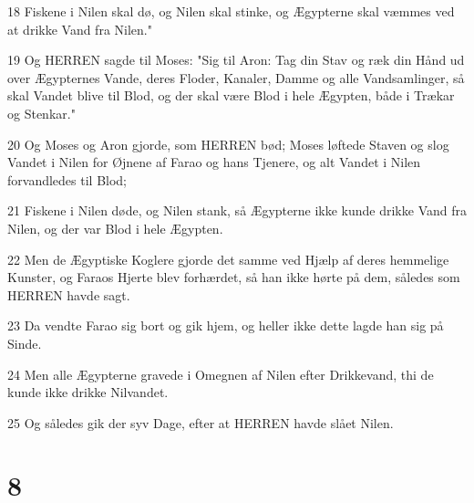 \par 18 Fiskene i Nilen skal dø, og Nilen skal stinke, og Ægypterne skal væmmes ved at drikke Vand fra Nilen."
\par 19 Og HERREN sagde til Moses: "Sig til Aron: Tag din Stav og ræk din Hånd ud over Ægypternes Vande, deres Floder, Kanaler, Damme og alle Vandsamlinger, så skal Vandet blive til Blod, og der skal være Blod i hele Ægypten, både i Trækar og Stenkar."
\par 20 Og Moses og Aron gjorde, som HERREN bød; Moses løftede Staven og slog Vandet i Nilen for Øjnene af Farao og hans Tjenere, og alt Vandet i Nilen forvandledes til Blod;
\par 21 Fiskene i Nilen døde, og Nilen stank, så Ægypterne ikke kunde drikke Vand fra Nilen, og der var Blod i hele Ægypten.
\par 22 Men de Ægyptiske Koglere gjorde det samme ved Hjælp af deres hemmelige Kunster, og Faraos Hjerte blev forhærdet, så han ikke hørte på dem, således som HERREN havde sagt.
\par 23 Da vendte Farao sig bort og gik hjem, og heller ikke dette lagde han sig på Sinde.
\par 24 Men alle Ægypterne gravede i Omegnen af Nilen efter Drikkevand, thi de kunde ikke drikke Nilvandet.
\par 25 Og således gik der syv Dage, efter at HERREN havde slået Nilen.

\chapter{8}

